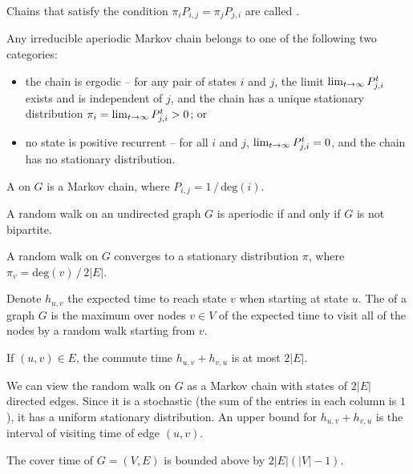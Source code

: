 \documentclass[main.tex]{subfiles}
\begin{document}
Chains that satisfy the condition $\pi_iP_{i,j}=\pi_jP_{j,i}$ are called .

\begin{theorem}
	Any irreducible aperiodic Markov chain belongs to one of the following two categories:
	\begin{itemize}
		\item the chain is ergodic -- for any pair of states $i$ and $j$, the limit $\lim_{t\rightarrow\infty}P^t_{j,i}$ exists and is independent of $j$, and the chain has a unique stationary distribution $\pi_i=\lim_{t\rightarrow\infty}P^t_{j,i}>0$; or 
		\item no state is positive recurrent -- for all $i$ and $j$, $\lim_{t\rightarrow\infty}P^t_{j,i}=0$, and the chain has no stationary distribution.
	\end{itemize}
\end{theorem}

A  on $G$ is a Markov chain, where $P_{i,j}=1\,/\,\mathrm{deg}(i)$.

\begin{lemma}
	A random walk on an undirected graph $G$ is aperiodic if and only if $G$ is not bipartite.
\end{lemma}

\begin{theorem}
	A random walk on $G$ converges to a stationary distribution $\pi$, where $\pi_v=\mathrm{deg}(v)\,/\,2 |E|$.
\end{theorem}

Denote  $h_{u,v}$ the expected time to reach state $v$ when starting at state $u$. The  of a graph $G$ is the maximum over nodes $v\in V$ of the expected time to visit all of the nodes by a random walk starting from $v$.

\begin{lemma}
	If $(u,v)\in E$, the commute time $h_{u,v}+h_{v,u}$ is at most $2 |E|$.
\end{lemma}

\begin{pf}
	We can view the random walk on $G$ as a Markov chain with states of $2 |E|$ directed edges. Since it is a  stochastic (the sum of the entries in each column is $1$), it has a uniform stationary distribution. An upper bound for $h_{u,v}+h_{v,u}$ is the interval of visiting time of edge $(u,v)$.
\end{pf}

\begin{lemma}
	The cover time of $G=(V,E)$ is bounded above by $2|E|(|V|-1)$.
\end{lemma}
\end{document}
